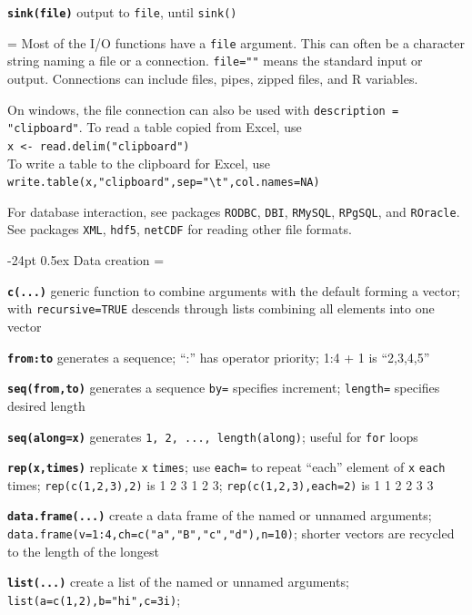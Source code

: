 \documentclass[10pt,landscape]{article}
\makeatletter
\renewcommand\section{\@startsection{section}{1}{0mm}%
                                     {-24pt}%
                                     {0.5ex}%
                                {\color{blue}\normalfont\large\bfseries}}
\newcommand{\code}{\texttt}
\newcommand{\bcode}[1]{\texttt{\textbf{#1}}}
\makeatother
\begin{document}
\begin{multicols*}{3}
\bcode{sink(file)} output to \code{file}, until \code{sink()}

\everypar={\hangindent=0mm}
Most of the I/O functions have a \code{file} argument. This can often
be a character string naming a file or a connection.  \code{file=""} means the standard input or
output. Connections can include files, pipes, zipped
files, and R variables. 

On windows, the file connection can also be used with \code{description =
"clipboard"}. To read a table copied from Excel, use \\
\code{x <- read.delim("clipboard")}\\
To write a table to the clipboard for Excel, use \\
\code{write.table(x,"clipboard",sep="\textbackslash t",col.names=NA)}

For database interaction, see packages \code{RODBC}, \code{DBI},
\code{RMySQL}, \code{RPgSQL}, and \code{ROracle}. See packages \code{XML}, \code{hdf5}, \code{netCDF} for reading
other file formats.





\section{Data creation}
\everypar={\hangindent=9mm}

\bcode{c(...)} generic function to combine arguments with the default
forming a vector;
with \code{recursive=TRUE} descends through lists combining all elements
into one vector

\bcode{from:to} generates a sequence; ``:'' has operator priority; 1:4
+ 1 is ``2,3,4,5''

\bcode{seq(from,to)} generates a sequence
\code{by=} specifies increment; \code{length=} specifies desired length

\bcode{seq(along=x)} generates \code{1, 2, ..., length(along)}; useful for
\code{for} loops

\bcode{rep(x,times)} replicate \code{x} \code{times}; use \code{each=}
to repeat ``each'' element of \code{x} \code{each} times;
\code{rep(c(1,2,3),2)} is 1 2 3 1 2 3; \code{rep(c(1,2,3),each=2)} is 1 1 2 2 3 3 

\bcode{data.frame(...)} create a data frame of the named or unnamed arguments;
  \code{data.frame(v=1:4,ch=c("a","B","c","d"),n=10)}; shorter vectors
  are recycled to the length of the longest 

\bcode{list(...)} create a list of the named or unnamed arguments;
  \code{list(a=c(1,2),b="hi",c=3i)}; 


\end{multicols*}
\end{document}
